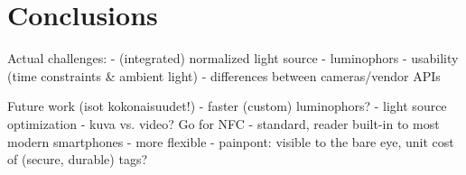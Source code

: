 \documentclass[thesis.tex]{subfiles}
\begin{document}
\chapter{Conclusions}
\label{chapter:conclusions}

Actual challenges:
- (integrated) normalized light source
- luminophors
- usability (time constraints \& ambient light)
- differences between cameras/vendor APIs

Future work (isot kokonaisuudet!)
  - faster (custom) luminophors?
  - light source optimization
  - kuva vs. video?
Go for NFC
- standard, reader built-in to most modern smartphones
- more flexible
- painpont: visible to the bare eye, unit cost of (secure, durable) tags?
\end{document}
